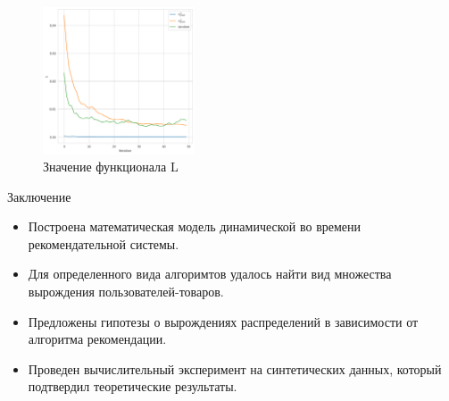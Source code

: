 \documentclass{beamer}
\begin{document}
\begin{frame}
\begin{columns}[c]
    \end{columns}
    

        \vspace*{-5mm}\begin{figure}
            \centering
            \includegraphics[width=0.4\textwidth]{images/new_photo/L.png}
            \caption{Значение функционала L}
        \end{figure}

    
\end{frame}







\begin{frame}{Заключение}
\begin{itemize}
    \item Построена математическая модель динамической во времени рекомендательной системы.  
    \item Для определенного вида алгоримтов удалось найти вид множества вырождения пользователей-товаров.
    \item Предложены гипотезы о вырождениях распределений в зависимости от алгоритма рекомендации.
    \item Проведен вычислительный эксперимент на синтетических данных, который подтвердил теоретические результаты.

\end{itemize}


    
\end{frame}


\end{document}
